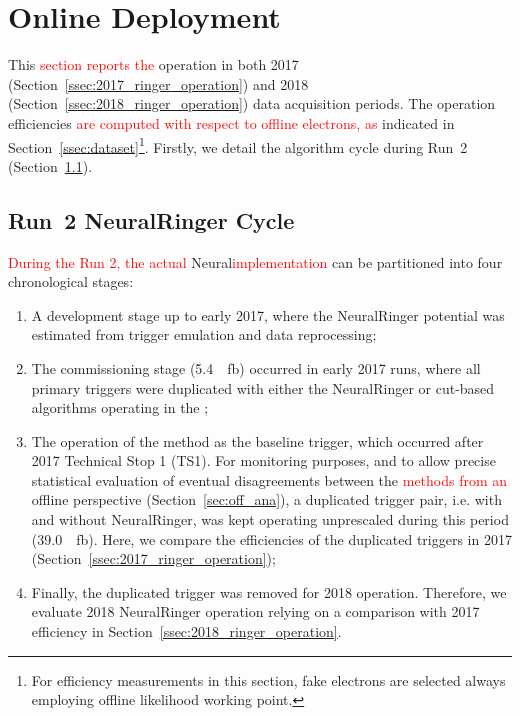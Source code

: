 \chapter{Online Deployment}%
\label{sec:operation}



This \textcolor{red}{section reports the} \rnn{} operation in both 2017
(Section~\ref{ssec:2017_ringer_operation}) and 2018
(Section~\ref{ssec:2018_ringer_operation}) data acquisition periods. The operation efficiencies
\textcolor{red}{are computed with respect to offline electrons, as} indicated in
Section~\ref{ssec:dataset}\footnote{For efficiency measurements in this section,
	fake electrons are selected always employing \veto\vloose{} offline likelihood
	working point.}. Firstly, we detail the algorithm cycle during Run~2
(Section~\ref{ssec:run2_rnn_cycle}).

\section{Run~2 NeuralRinger Cycle}\label{ssec:run2_rnn_cycle}

\textcolor{red}{During the Run 2, the actual} Neural\rnn \textcolor{red}{implementation} 
can be partitioned into four chronological stages:

\begin{enumerate}[i]
  \item A development stage up to early 2017, where the NeuralRinger
      potential was estimated from trigger emulation and data reprocessing;
  \item The commissioning stage (\SI{5.4}{\per\femto\barn}) occurred in
      early 2017 runs, where all primary
      triggers were duplicated with either the NeuralRinger or cut-based algorithms
      operating in the \fastcalo{};
  \item The operation of the method as the baseline trigger, which occurred after 2017 Technical Stop 1 (TS1). For
    monitoring purposes, and to allow precise statistical evaluation of eventual
    disagreements between the \fastcalo{} \textcolor{red}{methods from an} offline
    perspective (Section~\ref{sec:off_ana}), a duplicated trigger pair, i.e.
    with and without NeuralRinger, was kept operating unprescaled during this period
    (\SI{39.0}{\per\femto\barn}). Here, we compare the efficiencies of the
    duplicated triggers in 2017 (Section~\ref{ssec:2017_ringer_operation});
  \item Finally, the duplicated trigger was removed for 2018 operation.
    Therefore, we evaluate 2018 NeuralRinger operation relying on a comparison with
    2017 efficiency in Section~\ref{ssec:2018_ringer_operation}.
\end{enumerate}

